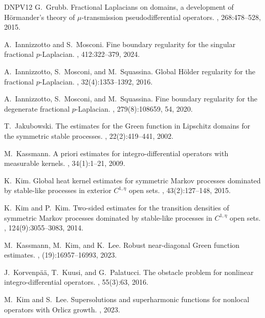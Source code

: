 \documentclass[11pt,reqno]{amsart}
\theoremstyle{plain}
\theoremstyle{definition}
\numberwithin{equation}{section}
\newcommand{\1}{\mathbbm{1}}
\begin{document}
\begin{thebibliography}{DNPV12}
G.~Grubb.
\newblock Fractional {L}aplacians on domains, a development of {H}\"ormander's
  theory of {$\mu$}-transmission pseudodifferential operators.
, 268:478--528, 2015.

A.~Iannizzotto and S.~Mosconi.
\newblock Fine boundary regularity for the singular fractional $p$-{L}aplacian.
, 412:322--379, 2024.

A.~Iannizzotto, S.~Mosconi, and M.~Squassina.
\newblock Global {H}\"older regularity for the fractional {$p$}-{L}aplacian.
, 32(4):1353--1392, 2016.

A.~Iannizzotto, S.~Mosconi, and M.~Squassina.
\newblock Fine boundary regularity for the degenerate fractional
  {$p$}-{L}aplacian.
, 279(8):108659, 54, 2020.

T.~Jakubowski.
\newblock The estimates for the {G}reen function in {L}ipschitz domains for the
  symmetric stable processes.
, 22(2):419--441, 2002.

M.~Kassmann.
\newblock A priori estimates for integro-differential operators with measurable
  kernels.
, 34(1):1--21, 2009.

K.~Kim.
\newblock Global heat kernel estimates for symmetric {M}arkov processes
  dominated by stable-like processes in exterior {$C^{1,\eta}$} open sets.
, 43(2):127--148, 2015.

K.~Kim and P.~Kim.
\newblock Two-sided estimates for the transition densities of symmetric
  {M}arkov processes dominated by stable-like processes in {$C^{1,\eta}$} open
  sets.
, 124(9):3055--3083, 2014.

M.~Kassmann, M.~Kim, and K.~Lee.
\newblock Robust near-diagonal {G}reen function estimates.
, (19):16957--16993, 2023.

J.~Korvenp{\"a}{\"a}, T.~Kuusi, and G.~Palatucci.
\newblock The obstacle problem for nonlinear integro-differential operators.
, 55(3):63, 2016.

M.~Kim and S.~Lee.
\newblock Supersolutions and superharmonic functions for nonlocal operators
  with {O}rlicz growth.
, 2023.


\end{thebibliography}
\end{document}
